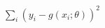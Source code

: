 \documentclass[10pt]{article}
\begin{document}
\begin{align*}\sum_i \left( y_i - g\left(x_i;\theta\right)\right)^2\end{align*}
\end{document}
